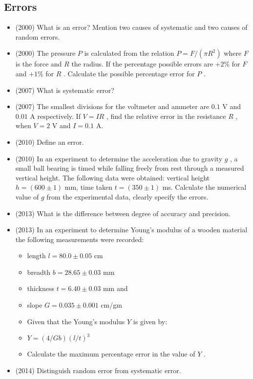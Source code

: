 \documentclass{article}
\begin{document}
\subsection{Errors}
\begin{itemize}
\item (2000)  What is an error? Mention two causes of systematic and two causes of random errors.
\item (2000)  The pressure $ P$ is calculated from the relation $ P=F/( \pi R^{2})$ where $ F$ is the force and $ R$ the radius. If the percentage possible errors are $ +2\%$ for $ F$ and $ +1\%$ for $ R$ . Calculate the possible percentage error for $ P$ .
\item (2007)  What is systematic error?
\item (2007)  The smallest divisions for the voltmeter and ammeter are $ 0.1$ V and $ 0.01$ A respectively.  If $ V=IR$ , find the relative error in the resistance $ R$ , when $ V=2$ V and $ I=0.1$ A.
\item (2010)  Define an error.
\item (2010)  In an experiment to determine the acceleration due to gravity $ g$ , a small ball bearing is timed while falling freely from rest through a measured vertical height. The following data were obtained: vertical height $ h=(600\pm 1)$ mm, time taken $ t=(350\pm 1)$ ms. Calculate the numerical value of $ g$ from the experimental data, clearly specify the errors. 
\item (2013)  What is the difference between degree of accuracy and precision.
\item (2013)  In an experiment to determine Young's modulus of a wooden material the following measurements were recorded:\begin{itemize}
\item length $ l=80.0\pm 0.05$ cm 
\item breadth $ b=28.65\pm 0.03$ mm
\item thickness $ t=6.40\pm 0.03$ mm and
\item slope $ G=0.035\pm 0.001$ cm/gm
\item Given that the Young’s modulus $ Y$ is given by:
\item $ Y=(4/Gb)(l/t)^{3}$
\item Calculate the maximum percentage error in the value of $ Y$ .
\end{itemize}
\item (2014)  Distinguish random error from systematic error.\begin{itemize}

\end{itemize}
\end{itemize}
\end{document}
